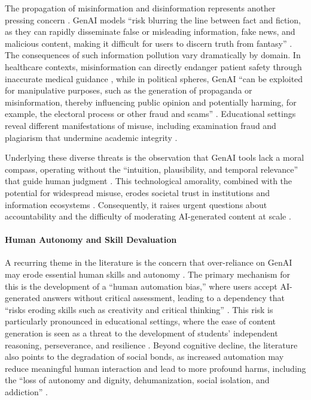 The propagation of misinformation and disinformation represents another pressing concern \parencite{R03, R08}. GenAI models \enquote{risk blurring the line between fact and fiction, as they can rapidly disseminate false or misleading information, fake news, and malicious content, making it difficult for users to discern truth from fantasy} \parencite{S09}. The consequences of such information pollution vary dramatically by domain. In healthcare contexts, misinformation can directly endanger patient safety through inaccurate medical guidance \parencite{S01}, while in political spheres, GenAI \enquote{can be exploited for manipulative purposes, such as the generation of propaganda or misinformation, thereby influencing public opinion and potentially harming, for example, the electoral process or other fraud and scams} \parencite{S09}. Educational settings reveal different manifestations of misuse, including examination fraud and plagiarism that undermine academic integrity \parencite{S12, S14}.

Underlying these diverse threats is the observation that GenAI tools lack a moral compass, operating without the \enquote{intuition, plausibility, and temporal relevance} that guide human judgment \parencite{R06}. This technological amorality, combined with the potential for widespread misuse, erodes societal trust in institutions and information ecosystems \parencite{S09}. Consequently, it raises urgent questions about accountability and the difficulty of moderating AI-generated content at scale \parencite{S01, S09, R07, S17}.

\paragraph{Human Autonomy and Skill Devaluation}
A recurring theme in the literature is the concern that over-reliance on GenAI may erode essential human skills and autonomy \parencite{S01, S08, R09, S17}. The primary mechanism for this is the development of a \enquote{human automation bias,} where users accept AI-generated answers without critical assessment, leading to a dependency that \enquote{risks eroding skills such as creativity and critical thinking} \parencite{S09}. This risk is particularly pronounced in educational settings, where the ease of content generation is seen as a threat to the development of students' independent reasoning, perseverance, and resilience \parencite{S12, S14}. Beyond cognitive decline, the literature also points to the degradation of social bonds, as increased automation may reduce meaningful human interaction and lead to more profound harms, including the \enquote{loss of autonomy and dignity, dehumanization, social isolation, and addiction} \parencite{R08, S11}.

